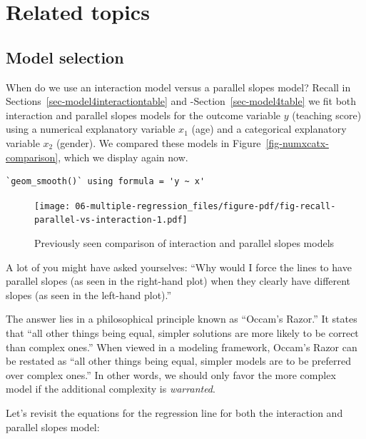 \documentclass[
  letterpaper,
  DIV=11,
  numbers=noendperiod]{scrreprt}
\theoremstyle{definition}
\theoremstyle{remark}
\begin{document}
\hypertarget{related-topics-1}{%
\section{Related topics}\label{related-topics-1}}

\hypertarget{sec-model-selection}{%
\subsection{Model selection}\label{sec-model-selection}}

When do we use an interaction model versus a parallel slopes model?
Recall in Sections~\ref{sec-model4interactiontable} and
-Section~\ref{sec-model4table} we fit both interaction and parallel
slopes models for the outcome variable \(y\) (teaching score) using a
numerical explanatory variable \(x_1\) (age) and a categorical
explanatory variable \(x_2\) (gender). We compared these models in
Figure~\ref{fig-numxcatx-comparison}, which we display again now.

\begin{verbatim}
`geom_smooth()` using formula = 'y ~ x'
\end{verbatim}

\begin{figure}

{\centering \texttt{[image: 06-multiple-regression\_files/figure-pdf/fig-recall-parallel-vs-interaction-1.pdf]}

}

\caption{\label{fig-recall-parallel-vs-interaction}Previously seen
comparison of interaction and parallel slopes models}

\end{figure}

A lot of you might have asked yourselves: ``Why would I force the lines
to have parallel slopes (as seen in the right-hand plot) when they
clearly have different slopes (as seen in the left-hand plot).''

The answer lies in a philosophical principle known as ``Occam's Razor.''
It states that ``all other things being equal, simpler solutions are
more likely to be correct than complex ones.'' When viewed in a modeling
framework, Occam's Razor  can be restated as ``all
other things being equal, simpler models are to be preferred over
complex ones.'' In other words, we should only favor the more complex
model if the additional complexity is \emph{warranted}.

Let's revisit the equations for the regression line for both the
interaction and parallel slopes model:
\end{document}
